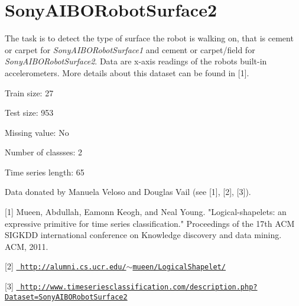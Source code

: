 \chapter{Sony\+AIBORobot\+Surface2}
\hypertarget{md_external_2data_2UCRArchive__2018_2SonyAIBORobotSurface2_2README}{}\label{md_external_2data_2UCRArchive__2018_2SonyAIBORobotSurface2_2README}
\label{md_external_2data_2UCRArchive__2018_2SonyAIBORobotSurface2_2README_autotoc_md213}%
%
 The task is to detect the type of surface the robot is walking on, that is cement or carpet for {\itshape Sony\+AIBORobot\+Surface1} and cement or carpet/field for {\itshape Sony\+AIBORobot\+Surface2}. Data are x-\/axis readings of the robot\textquotesingle{}s built-\/in accelerometers. More details about this dataset can be found in \mbox{[}1\mbox{]}.

Train size\+: 27

Test size\+: 953

Missing value\+: No

Number of classses\+: 2

Time series length\+: 65

Data donated by Manuela Veloso and Douglas Vail (see \mbox{[}1\mbox{]}, \mbox{[}2\mbox{]}, \mbox{[}3\mbox{]}).

\mbox{[}1\mbox{]} Mueen, Abdullah, Eamonn Keogh, and Neal Young. "{}\+Logical-\/shapelets\+: an expressive primitive for time series classification."{} Proceedings of the 17th ACM SIGKDD international conference on Knowledge discovery and data mining. ACM, 2011.

\mbox{[}2\mbox{]} \href{http://alumni.cs.ucr.edu/~mueen/LogicalShapelet/}{\texttt{ http\+://alumni.\+cs.\+ucr.\+edu/\texorpdfstring{$\sim$}{\string~}mueen/\+Logical\+Shapelet/}}

\mbox{[}3\mbox{]} \href{http://www.timeseriesclassification.com/description.php?Dataset=SonyAIBORobotSurface2}{\texttt{ http\+://www.\+timeseriesclassification.\+com/description.\+php?\+Dataset=\+Sony\+AIBORobot\+Surface2}} 